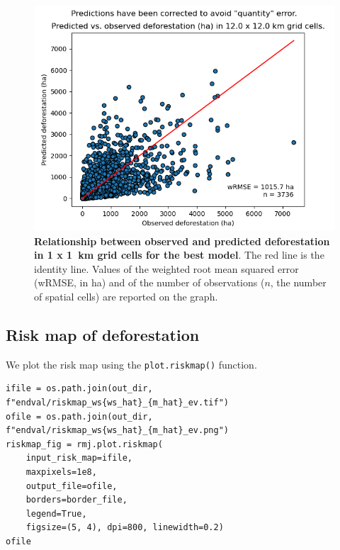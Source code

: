 \documentclass[paper=a4, 12pt, DIV=12]{scrartcl}
\begin{document}
\begin{figure}[H]
\centering
\includegraphics[width=0.8\linewidth]{outputs_kenya/modcomp/pred_obs_ws37_ei.png}
\caption{\label{fig:org9ea2473}\textbf{Relationship between observed and predicted deforestation in 1 x 1 km grid cells for the best model}. The red line is the identity line. Values of the weighted root mean squared error (wRMSE, in ha) and of the number of observations (\(n\), the number of spatial cells) are reported on the graph.}
\end{figure}

\subsection{Risk map of deforestation}
\label{sec:org69885b6}

We plot the risk map using the \texttt{plot.riskmap()} function.

\begin{verbatim}
ifile = os.path.join(out_dir, f"endval/riskmap_ws{ws_hat}_{m_hat}_ev.tif")
ofile = os.path.join(out_dir, f"endval/riskmap_ws{ws_hat}_{m_hat}_ev.png")
riskmap_fig = rmj.plot.riskmap(
    input_risk_map=ifile,
    maxpixels=1e8,
    output_file=ofile,
    borders=border_file,
    legend=True,
    figsize=(5, 4), dpi=800, linewidth=0.2)
ofile
\end{verbatim}
\end{document}
